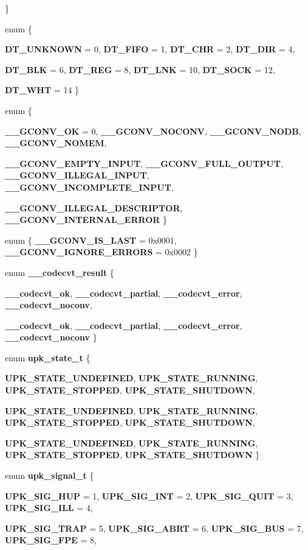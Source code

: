 \begin{DoxyCompactItemize}
 \}
\item 
enum \{ \par
{\bf DT\_\-UNKNOWN} =  0, 
{\bf DT\_\-FIFO} =  1, 
{\bf DT\_\-CHR} =  2, 
{\bf DT\_\-DIR} =  4, 
\par
{\bf DT\_\-BLK} =  6, 
{\bf DT\_\-REG} =  8, 
{\bf DT\_\-LNK} =  10, 
{\bf DT\_\-SOCK} =  12, 
\par
{\bf DT\_\-WHT} =  14
 \}
\item 
enum \{ \par
{\bf \_\-\_\-GCONV\_\-OK} =  0, 
{\bf \_\-\_\-GCONV\_\-NOCONV}, 
{\bf \_\-\_\-GCONV\_\-NODB}, 
{\bf \_\-\_\-GCONV\_\-NOMEM}, 
\par
{\bf \_\-\_\-GCONV\_\-EMPTY\_\-INPUT}, 
{\bf \_\-\_\-GCONV\_\-FULL\_\-OUTPUT}, 
{\bf \_\-\_\-GCONV\_\-ILLEGAL\_\-INPUT}, 
{\bf \_\-\_\-GCONV\_\-INCOMPLETE\_\-INPUT}, 
\par
{\bf \_\-\_\-GCONV\_\-ILLEGAL\_\-DESCRIPTOR}, 
{\bf \_\-\_\-GCONV\_\-INTERNAL\_\-ERROR}
 \}
\item 
enum \{ {\bf \_\-\_\-GCONV\_\-IS\_\-LAST} =  0x0001, 
{\bf \_\-\_\-GCONV\_\-IGNORE\_\-ERRORS} =  0x0002
 \}
\item 
enum {\bf \_\-\_\-codecvt\_\-result} \{ \par
{\bf \_\-\_\-codecvt\_\-ok}, 
{\bf \_\-\_\-codecvt\_\-partial}, 
{\bf \_\-\_\-codecvt\_\-error}, 
{\bf \_\-\_\-codecvt\_\-noconv}, 
\par
{\bf \_\-\_\-codecvt\_\-ok}, 
{\bf \_\-\_\-codecvt\_\-partial}, 
{\bf \_\-\_\-codecvt\_\-error}, 
{\bf \_\-\_\-codecvt\_\-noconv}
 \}
\item 
enum {\bf upk\_\-state\_\-t} \{ \par
{\bf UPK\_\-STATE\_\-UNDEFINED}, 
{\bf UPK\_\-STATE\_\-RUNNING}, 
{\bf UPK\_\-STATE\_\-STOPPED}, 
{\bf UPK\_\-STATE\_\-SHUTDOWN}, 
\par
{\bf UPK\_\-STATE\_\-UNDEFINED}, 
{\bf UPK\_\-STATE\_\-RUNNING}, 
{\bf UPK\_\-STATE\_\-STOPPED}, 
{\bf UPK\_\-STATE\_\-SHUTDOWN}, 
\par
{\bf UPK\_\-STATE\_\-UNDEFINED}, 
{\bf UPK\_\-STATE\_\-RUNNING}, 
{\bf UPK\_\-STATE\_\-STOPPED}, 
{\bf UPK\_\-STATE\_\-SHUTDOWN}
 \}
\item 
enum {\bf upk\_\-signal\_\-t} \{ \par
{\bf UPK\_\-SIG\_\-HUP} =  1, 
{\bf UPK\_\-SIG\_\-INT} =  2, 
{\bf UPK\_\-SIG\_\-QUIT} =  3, 
{\bf UPK\_\-SIG\_\-ILL} =  4, 
\par
{\bf UPK\_\-SIG\_\-TRAP} =  5, 
{\bf UPK\_\-SIG\_\-ABRT} =  6, 
{\bf UPK\_\-SIG\_\-BUS} =  7, 
{\bf UPK\_\-SIG\_\-FPE} =  8, 

\end{DoxyCompactItemize}
